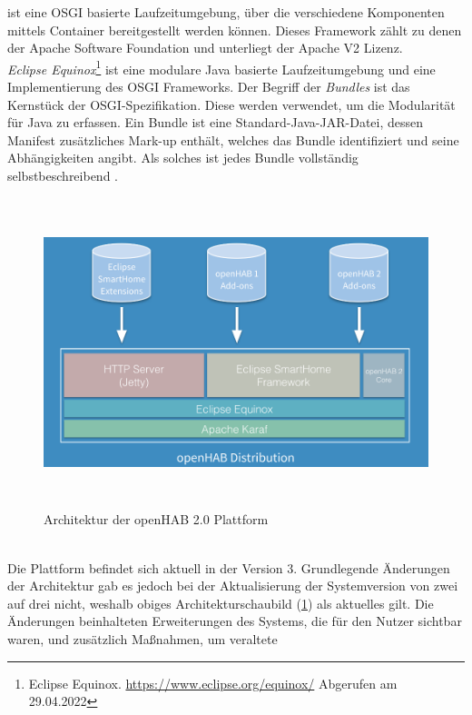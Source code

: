     ist eine \acs{OSGI} basierte Laufzeitumgebung, über die verschiedene Komponenten mittels Container 
    bereitgestellt werden können. Dieses Framework zählt zu denen der Apache Software Foundation und unterliegt der Apache V2 Lizenz.
    \\
    \linebreak
    \textit{Eclipse Equinox}\footnote{Eclipse Equinox. \url{https://www.eclipse.org/equinox/} Abgerufen am 29.04.2022} ist eine modulare 
    Java basierte Laufzeitumgebung und eine Implementierung des \acs{OSGI} Frameworks. Der Begriff der \textit{Bundles} ist das 
    Kernstück der \acs{OSGI}-Spezifikation. Diese werden verwendet, um die Modularität für Java zu erfassen. Ein Bundle ist 
    eine Standard-Java-JAR-Datei, dessen Manifest zusätzliches Mark-up enthält, welches das Bundle identifiziert und seine Abhängigkeiten 
    angibt. Als solches ist jedes Bundle vollständig selbstbeschreibend \cite{openHAB-article}. 
    \begin{figure}[hbt!]
        \centering
        \includegraphics[width=15cm,height=9cm,keepaspectratio]{images/openhab-2-architecture.png}
        \caption{Architektur der openHAB 2.0 Plattform \cite{kaikreutzer2016}}
        \label{fig:architectureopenHAB2}
    \end{figure}
    \\
    Die Plattform befindet sich aktuell in der Version 3. Grundlegende Änderungen der Architektur gab es jedoch bei der Aktualisierung 
    der Systemversion von zwei auf drei nicht, weshalb obiges Architekturschaubild (\ref{fig:architectureopenHAB2}) als aktuelles gilt. 
    Die Änderungen beinhalteten Erweiterungen des Systems, die für den Nutzer sichtbar waren, und zusätzlich Maßnahmen, um veraltete 
